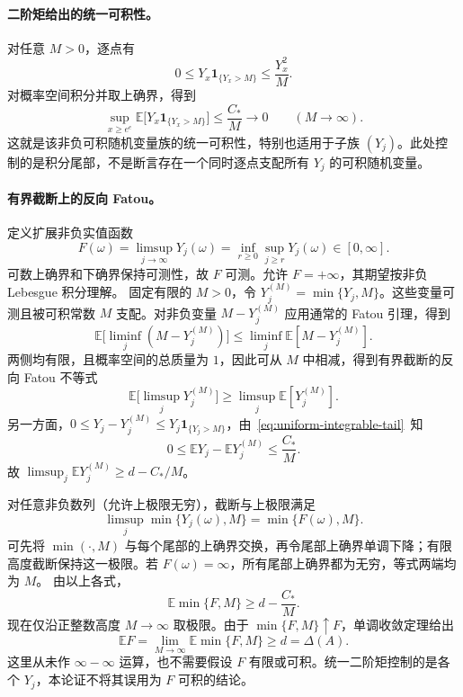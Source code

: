 \paragraph{二阶矩给出的统一可积性。}
对任意 $M>0$，逐点有
\[
 0\le Y_x\mathbf1_{\{Y_x>M\}}\le\frac{Y_x^2}{M}.
\]
对概率空间积分并取上确界，得到
\begin{equation}\label{eq:uniform-integrable-tail}
 \sup_{x\ge e^e}\mathbb E\bigl[Y_x\mathbf1_{\{Y_x>M\}}\bigr]
 \le\frac{C_*}{M}\longrightarrow0\qquad(M\to\infty).
\end{equation}
这就是该非负可积随机变量族的统一可积性，特别也适用于子族 $(Y_j)$。此处控制的是积分尾部，不是断言存在一个同时逐点支配所有 $Y_j$ 的可积随机变量。

\paragraph{有界截断上的反向 Fatou。}
定义扩展非负实值函数
\[
 F(\omega)=\limsup_{j\to\infty}Y_j(\omega)
 =\inf_{r\ge0}\sup_{j\ge r}Y_j(\omega)\in[0,\infty].
\]
可数上确界和下确界保持可测性，故 $F$ 可测。允许 $F=+\infty$，其期望按非负 Lebesgue 积分理解。
固定有限的 $M>0$，令 $Y_j^{(M)}=\min\{Y_j,M\}$。这些变量可测且被可积常数 $M$ 支配。对非负变量 $M-Y_j^{(M)}$ 应用通常的 Fatou 引理，得到
\[
 \mathbb E\bigl[\liminf_j(M-Y_j^{(M)})\bigr]
 \le\liminf_j\mathbb E[M-Y_j^{(M)}].
\]
两侧均有限，且概率空间的总质量为 $1$，因此可从 $M$ 中相减，得到有界截断的反向 Fatou 不等式
\begin{equation}\label{eq:truncated-reverse-fatou}
 \mathbb E\bigl[\limsup_jY_j^{(M)}\bigr]
 \ge\limsup_j\mathbb E[Y_j^{(M)}].
\end{equation}
另一方面，$0\le Y_j-Y_j^{(M)}\le Y_j\mathbf1_{\{Y_j>M\}}$，由~\eqref{eq:uniform-integrable-tail}~知
\[
 0\le\mathbb E Y_j-\mathbb E Y_j^{(M)}\le\frac{C_*}{M}.
\]
故 $\limsup_j\mathbb E Y_j^{(M)}\ge d-C_*/M$。

对任意非负数列（允许上极限无穷），截断与上极限满足
\begin{equation}\label{eq:truncation-limsup-commute}
 \limsup_j\min\{Y_j(\omega),M\}=\min\{F(\omega),M\}.
\end{equation}
可先将 $\min(\cdot,M)$ 与每个尾部的上确界交换，再令尾部上确界单调下降；有限高度截断保持这一极限。若 $F(\omega)=\infty$，所有尾部上确界都为无穷，等式两端均为 $M$。
由以上各式，
\[
 \mathbb E\min\{F,M\}\ge d-\frac{C_*}{M}.
\]
现在仅沿正整数高度 $M\to\infty$ 取极限。由于 $\min\{F,M\}\uparrow F$，单调收敛定理给出
\begin{equation}\label{eq:fatou-extended-expectation}
 \boxed{\mathbb E F
 =\lim_{M\to\infty}\mathbb E\min\{F,M\}
 \ge d=\Delta(A).}
\end{equation}
这里从未作 $\infty-\infty$ 运算，也不需要假设 $F$ 有限或可积。统一二阶矩控制的是各个 $Y_j$，本论证不将其误用为 $F$ 可积的结论。

